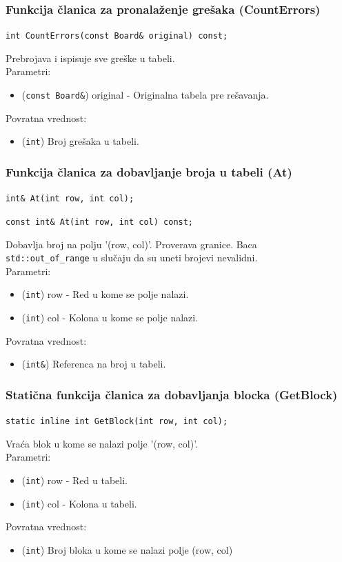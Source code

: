 \documentclass[a4paper]{article}
\begin{document}
    \subsubsection{Funkcija članica za pronalaženje grešaka (CountErrors)}
    \texttt{int CountErrors(const Board\& original) const;}
    \par Prebrojava i ispisuje sve greške u tabeli.\\
    Parametri:
    \begin{itemize}
        \item (\texttt{const Board\&}) original - Originalna tabela pre rešavanja.
    \end{itemize}
    Povratna vrednost:
    \begin{itemize}
        \item (\texttt{int}) Broj grešaka u tabeli.
    \end{itemize}

    \subsubsection{Funkcija članica za dobavljanje broja u tabeli (At)}
    \texttt{int\& At(int row, int col);}
    \par\texttt{const int\& At(int row, int col) const;}
    \par Dobavlja broj na polju '(row, col)'. Proverava granice. Baca \\ \texttt{std::out\_of\_range} u slučaju da
    su uneti brojevi nevalidni.\\
    Parametri:
    \begin{itemize}
        \item (\texttt{int}) row - Red u kome se polje nalazi.
        \item (\texttt{int}) col - Kolona u kome se polje nalazi.
    \end{itemize}
    Povratna vrednost:
    \begin{itemize}
        \item (\texttt{int\&}) Referenca na broj u tabeli.
    \end{itemize}
    

    \subsubsection{Statična funkcija članica za dobavljanja blocka (GetBlock)}
    \texttt{static inline int GetBlock(int row, int col);}
    \par Vraća blok u kome se nalazi polje '(row, col)'.\\
    Parametri:
    \begin{itemize}
        \item (\texttt{int}) row - Red u tabeli.
        \item (\texttt{int}) col - Kolona u tabeli.
    \end{itemize}
    Povratna vrednost:
    \begin{itemize}
        \item (\texttt{int}) Broj bloka u kome se nalazi polje (row, col)
    \end{itemize}
\end{document}

